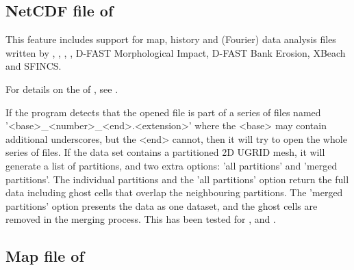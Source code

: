 \subsection{NetCDF file of \dfmsuite}\label{Sec:FileNC_dfm}

\begin{Remark}
\item This feature includes support for map, history and (Fourier) data analysis files written by \dflowfmfull, \dmorphology, \dwaves, \dwaq, D-FAST Morphological Impact, D-FAST Bank Erosion, XBeach and SFINCS.
\item For details on the  of \dflowfm, see .
\item If the program detects that the opened file is part of a series of files named '<base>\_\allowbreak<number>\_<end>.<extension>' where the <base> may contain additional underscores, but the <end> cannot, then it will try to open the whole series of files.
If the data set contains a partitioned 2D UGRID mesh, it will generate a list of partitions, and two extra options: 'all partitions' and 'merged partitions'.
The individual partitions and the 'all partitions' option return the full data including ghost cells that overlap the neighbouring partitions.
The 'merged partitions' option presents the data as one dataset, and the ghost cells are removed in the merging process.
This has been tested for ,  and .
\end{Remark}


\subsection{Map file of \dflowfm}\label{Sec:FileNC_map}

